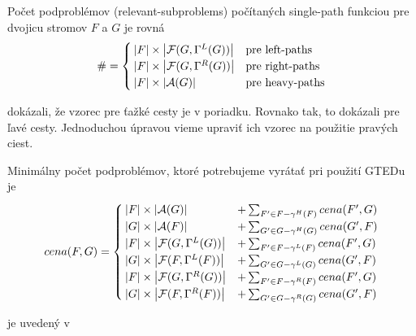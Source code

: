 \begin{lemma}
  Počet podproblémov (relevant-subproblems) počítaných single-path funkciou pre dvojicu
  stromov $F$ a $G$ je rovná
  \begin{align*}
    \# = 
    \begin{cases}
      \left|{F}\right| \times \left|{\mathcal{F}(G, \Gamma^{L}(G))}\right| & \text{pre left-paths}
      \\
      \left|{F}\right| \times \left|{\mathcal{F}(G, \Gamma^{R}(G))}\right| & \text{pre right-paths}
      \\
      \left|{F}\right| \times \left|{\mathcal{A}(G)}\right| & \text{pre heavy-paths}
    \end{cases}
  \end{align*}
\end{lemma}

\begin{dukaz}
  \citet{DMRW} dokázali, že vzorec pre ťažké cesty je v poriadku. Rovnako tak,
  \citet{ZHANGSHASHA} to dokázali pre ľavé cesty. Jednoduchou úpravou vieme upraviť
  ich vzorec na použitie pravých ciest.
\end{dukaz}

\begin{definice}
  Minimálny počet podproblémov, ktoré potrebujeme vyrátať pri použití GTEDu je
  \begin{align*}
    cena(F, G) =
    \begin{cases}
      \left|{F}\right| \times \left|{\mathcal{A}(G)}\right| &+ \sum_{{F}' \in F - \gamma^{H}(F)}cena({F}', G)
      \\
      \left|{G}\right| \times \left|{\mathcal{A}(F)}\right| &+ \sum_{{G}' \in G - \gamma^{H}(G)}cena({G}', F)
      \\
      \left|{F}\right| \times \left|{\mathcal{F}(G, \Gamma^{L}(G))}\right| &+ \sum_{{F}' \in F - \gamma^{L}(F)}cena({F}', G)
      \\
      \left|{G}\right| \times \left|{\mathcal{F}(F, \Gamma^{L}(F))}\right| &+ \sum_{{G}' \in G - \gamma^{L}(G)}cena({G}', F)
      \\
      \left|{F}\right| \times \left|{\mathcal{F}(G, \Gamma^{R}(G))}\right| &+ \sum_{{F}' \in F - \gamma^{R}(F)}cena({F}', G)
      \\
      \left|{G}\right| \times \left|{\mathcal{F}(F, \Gamma^{R}(F))}\right| &+ \sum_{{G}' \in G - \gamma^{R}(G)}cena({G}', F)
    \end{cases}
  \end{align*}
\end{definice}

\begin{dukaz}
  je uvedený v \citet{RTED}
\end{dukaz}

